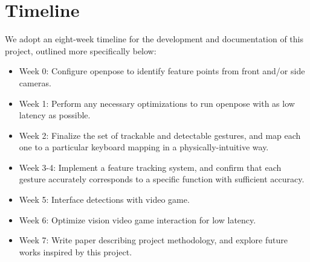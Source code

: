 \documentclass[10pt,twocolumn,letterpaper]{article}
\begin{document}
\section{Timeline}
We adopt an eight-week timeline for the development and documentation of this project, outlined 
more specifically below:
\begin{itemize}
    \item Week 0: Configure openpose to identify feature points from front and/or side cameras.
    \item Week 1: Perform any necessary optimizations to run openpose with as low latency as possible.
    \item Week 2: Finalize the set of trackable and detectable gestures, and map each one to a particular keyboard mapping in a physically-intuitive way.
    \item Week 3-4: Implement a feature tracking system, and confirm that each gesture accurately corresponds to a specific function with sufficient accuracy.
    \item Week 5: Interface detections with video game.
    \item Week 6: Optimize vision video game interaction for low latency.
    \item Week 7: Write paper describing project methodology, and explore future works inspired by this project.
\end{itemize}

{\small


}
\end{document}
